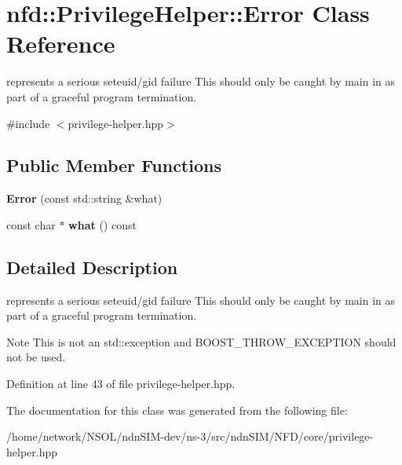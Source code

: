 \hypertarget{classnfd_1_1PrivilegeHelper_1_1Error}{}\section{nfd\+:\+:Privilege\+Helper\+:\+:Error Class Reference}
\label{classnfd_1_1PrivilegeHelper_1_1Error}


represents a serious seteuid/gid failure  This should only be caught by main in as part of a graceful program termination.  




{\ttfamily \#include $<$privilege-\/helper.\+hpp$>$}

\subsection*{Public Member Functions}
\begin{DoxyCompactItemize}
\item 
{\bfseries Error} (const std\+::string \&what)\hypertarget{classnfd_1_1PrivilegeHelper_1_1Error_a9be16677a9d6e215b3883df287c03c79}{}\label{classnfd_1_1PrivilegeHelper_1_1Error_a9be16677a9d6e215b3883df287c03c79}

\item 
const char $\ast$ {\bfseries what} () const\hypertarget{classnfd_1_1PrivilegeHelper_1_1Error_af03cdc757981093d264759bde1411472}{}\label{classnfd_1_1PrivilegeHelper_1_1Error_af03cdc757981093d264759bde1411472}

\end{DoxyCompactItemize}


\subsection{Detailed Description}
represents a serious seteuid/gid failure  This should only be caught by main in as part of a graceful program termination. 

\begin{DoxyNote}{Note}
This is not an std\+::exception and B\+O\+O\+S\+T\+\_\+\+T\+H\+R\+O\+W\+\_\+\+E\+X\+C\+E\+P\+T\+I\+ON should not be used. 
\end{DoxyNote}


Definition at line 43 of file privilege-\/helper.\+hpp.



The documentation for this class was generated from the following file\+:\begin{DoxyCompactItemize}
\item 
/home/network/\+N\+S\+O\+L/ndn\+S\+I\+M-\/dev/ns-\/3/src/ndn\+S\+I\+M/\+N\+F\+D/core/privilege-\/helper.\+hpp\end{DoxyCompactItemize}
